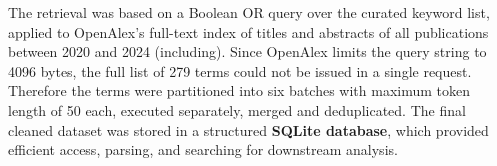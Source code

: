 \documentclass{article}
\begin{document}
The retrieval was based on a Boolean OR query over the curated keyword list, applied to OpenAlex’s full-text index of titles and abstracts of all publications between 2020 and 2024 (including). Since OpenAlex limits the query string to 4096 bytes, the full list of 279 terms could not be issued in a single request. Therefore the terms were partitioned into six batches with maximum token length of 50 each, executed separately, merged and deduplicated. The final cleaned dataset was stored in a structured \textbf{SQLite database}, which provided efficient access, parsing, and searching for downstream analysis.

\end{document}
